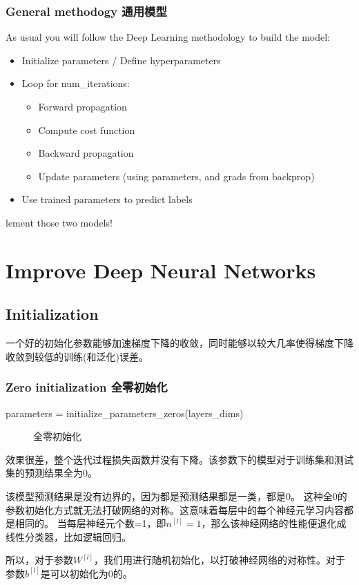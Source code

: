 \documentclass[UTF8]{ctexart}
\begin{document}
  \subsubsection{General methodogy 通用模型}
  As usual you will follow the Deep Learning methodology to build the model:
  \begin{itemize}
    \item Initialize parameters / Define hyperparameters
    \item Loop for num\_iterations:
    \begin{itemize}
      \item Forward propagation
      \item Compute cost function
      \item Backward propagation
      \item Update parameters (using parameters, and grads from backprop)
    \end{itemize}
    \item Use trained parameters to predict labels
  \end{itemize}
lement those two models!

\section{Improve Deep Neural Networks}
\subsection{Initialization}
一个好的初始化参数能够加速梯度下降的收敛，同时能够以较大几率使得梯度下降收敛到较低的训练(和泛化)误差。
\subsubsection{Zero initialization 全零初始化 }
 parameters = initialize\_parameters\_zeros(layers\_dims)
 \begin{figure}[htb]
  \caption{全零初始化}
   \label{fig:14}
  \end{figure}

效果很差，整个迭代过程损失函数并没有下降。该参数下的模型对于训练集和测试集的预测结果全为0。

该模型预测结果是没有边界的，因为都是预测结果都是一类，都是0。
这种全0的参数初始化方式就无法打破网络的对称。这意味着每层中的每个神经元学习内容都是相同的。
当每层神经元个数=1，即$n^{[l]}=1$，那么该神经网络的性能便退化成线性分类器，比如逻辑回归。

所以，对于参数$W^{[l]}$，我们用进行随机初始化，以打破神经网络的对称性。对于参数$b^{[l]}$是可以初始化为0的。
\end{document}
